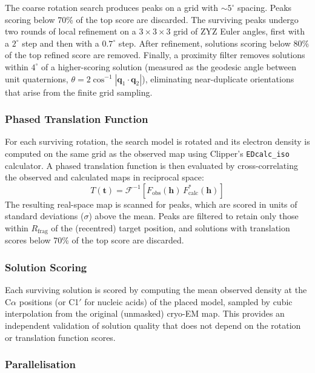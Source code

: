 The coarse rotation search produces peaks on a grid with
$\sim\!5^\circ$ spacing. Peaks scoring below 70\% of the top score are
discarded. The surviving peaks undergo two rounds of local refinement
on a $3\times3\times3$ grid of ZYZ Euler angles, first with a
$2^\circ$ step and then with a $0.7^\circ$ step. After refinement,
solutions scoring below 80\% of the top refined score are removed.
Finally, a proximity filter removes solutions within $4^\circ$ of a
higher-scoring solution (measured as the geodesic angle between unit
quaternions, $\theta = 2\cos^{-1}|\mathbf{q}_1 \cdot \mathbf{q}_2|$),
eliminating near-duplicate orientations that arise from the finite
grid sampling.

\subsubsection{Phased Translation Function}

For each surviving rotation, the search model is rotated and its
electron density is computed on the same grid as the observed map
using Clipper's \texttt{EDcalc\_iso} calculator. A phased translation
function is then evaluated by cross-correlating the observed and
calculated maps in reciprocal space:
%
\begin{equation}
  T(\mathbf{t}) = \mathcal{F}^{-1}\!\left[
    F_\text{obs}(\mathbf{h})\, F_\text{calc}^*(\mathbf{h})
  \right]
\end{equation}
%
The resulting real-space map is scanned for peaks, which are scored in
units of standard deviations ($\sigma$) above the mean. Peaks are
filtered to retain only those within $R_\text{frag}$ of the
(recentred) target position, and solutions with translation scores
below 70\% of the top score are discarded.

\subsubsection{Solution Scoring}

Each surviving solution is scored by computing the mean observed
density at the C$\alpha$ positions (or C1$'$ for nucleic acids) of
the placed model, sampled by cubic interpolation from the original
(unmasked) cryo-EM map. This provides an independent validation of
solution quality that does not depend on the rotation or translation
function scores.

\subsubsection{Parallelisation}

